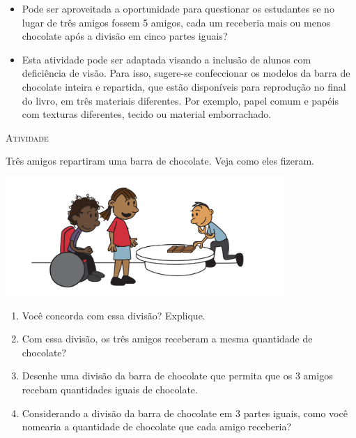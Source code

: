 \documentclass[10 pt,usenames,dvipsnames, oneside]{article}
\begin{document}
\begin{goals}
\begin{itemize}
\item Pode ser aproveitada a oportunidade para questionar os estudantes se no lugar de três amigos fossem 5 amigos, cada um receberia mais ou menos chocolate após a divisão em cinco partes iguais?
\item Esta atividade pode ser adaptada visando a inclusão de alunos com deficiência de visão. Para isso, sugere-se confeccionar os modelos da barra de chocolate  inteira e repartida, que estão disponíveis para reprodução no final do livro, em três materiais diferentes. Por exemplo, papel comum e papéis com texturas diferentes, tecido ou material emborrachado.
\end{itemize}

\end{goals}

\bigskip
\begin{center}
{\large \scshape Atividade}
\end{center}
\fi

Três amigos repartiram uma barra de chocolate. Veja como eles fizeram.

  \begin{center}
    \includegraphics[width=300pt, keepaspectratio]{ativ1_fig01.png}
  \end{center}

\begin{enumerate}[label=\alph*)] %
  \item Você concorda com essa divisão? Explique.
  \item Com essa divisão, os três amigos receberam a mesma quantidade de chocolate?
  \item Desenhe uma divisão da barra de chocolate que permita que os 3 amigos recebam quantidades iguais de chocolate.

    \begin{center}
    \end{center}

  \item Considerando a divisão da barra de chocolate em 3 partes iguais, como você nomearia a quantidade de chocolate que cada amigo receberia?
\end{enumerate} %
\end{document}
